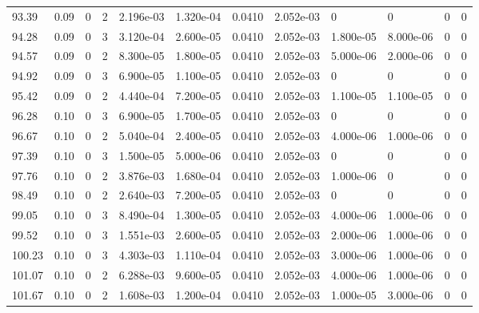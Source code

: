 \documentclass[preview]{standalone}
\begin{document}
{{{{{\begin{tabular}{L{1.2cm}C{1.2cm} C{0.3cm}C{0.5cm} C{1.4cm}C{1.4cm} C{1.4cm}C{1.4cm} C{1.6cm}C{1.6cm} C{1.6cm}C{1.6cm}}
  93.39  &  0.09  & 0     &  2 &  2.196e-03  & 1.320e-04  &  0.0410&   2.052e-03& 0 & 0   &  0 & 0  \\ 
  94.28  &  0.09  & 0     &  3 &  3.120e-04  & 2.600e-05  &  0.0410&   2.052e-03& 1.800e-05 & 8.000e-06   &  0 & 0  \\ 
  94.57  &  0.09  & 0     &  2 &  8.300e-05  & 1.800e-05  &  0.0410&   2.052e-03& 5.000e-06 & 2.000e-06   &  0 & 0  \\ 
  94.92  &  0.09  & 0     &  3 &  6.900e-05  & 1.100e-05  &  0.0410&   2.052e-03& 0 & 0   &  0 & 0  \\ 
  95.42  &  0.09  & 0     &  2 &  4.440e-04  & 7.200e-05  &  0.0410&   2.052e-03& 1.100e-05 & 1.100e-05   &  0 & 0  \\ 
  96.28  &  0.10  & 0     &  3 &  6.900e-05  & 1.700e-05  &  0.0410&   2.052e-03& 0 & 0   &  0 & 0  \\ 
  96.67  &  0.10  & 0     &  2 &  5.040e-04  & 2.400e-05  &  0.0410&   2.052e-03& 4.000e-06 & 1.000e-06   &  0 & 0  \\ 
  97.39  &  0.10  & 0     &  3 &  1.500e-05  & 5.000e-06  &  0.0410&   2.052e-03& 0 & 0   &  0 & 0  \\ 
  97.76  &  0.10  & 0     &  2 &  3.876e-03  & 1.680e-04  &  0.0410&   2.052e-03& 1.000e-06 & 0   &  0 & 0  \\ 
  98.49  &  0.10  & 0     &  2 &  2.640e-03  & 7.200e-05  &  0.0410&   2.052e-03& 0 & 0   &  0 & 0  \\ 
  99.05  &  0.10  & 0     &  3 &  8.490e-04  & 1.300e-05  &  0.0410&   2.052e-03& 4.000e-06 & 1.000e-06   &  0 & 0  \\ 
  99.52  &  0.10  & 0     &  3 &  1.551e-03  & 2.600e-05  &  0.0410&   2.052e-03& 2.000e-06 & 1.000e-06   &  0 & 0  \\ 
  100.23  &  0.10  & 0     &  3 &  4.303e-03  & 1.110e-04  &  0.0410&   2.052e-03& 3.000e-06 & 1.000e-06   &  0 & 0  \\ 
  101.07  &  0.10  & 0     &  2 &  6.288e-03  & 9.600e-05  &  0.0410&   2.052e-03& 4.000e-06 & 1.000e-06   &  0 & 0  \\ 
  101.67  &  0.10  & 0     &  2 &  1.608e-03  & 1.200e-04  &  0.0410&   2.052e-03& 1.000e-05 & 3.000e-06   &  0 & 0  \\ 
\hline 
\end{tabular} 

}}}}}
\end{document}
